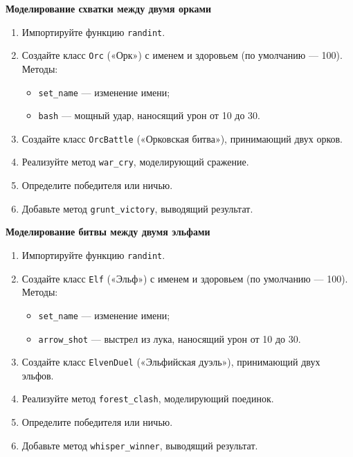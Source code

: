 \item \textbf{Моделирование схватки между двумя орками}

\begin{enumerate}
    \item Импортируйте функцию \texttt{randint}.

    \item Создайте класс \texttt{Orc} («Орк») с именем и здоровьем (по умолчанию — 100).  
    Методы:
    \begin{itemize}
        \item \texttt{set\_name} — изменение имени;
        \item \texttt{bash} — мощный удар, наносящий урон от 10 до 30.
    \end{itemize}

    \item Создайте класс \texttt{OrcBattle} («Орковская битва»), принимающий двух орков.

    \item Реализуйте метод \texttt{war\_cry}, моделирующий сражение.

    \item Определите победителя или ничью.

    \item Добавьте метод \texttt{grunt\_victory}, выводящий результат.
\end{enumerate}

\item \textbf{Моделирование битвы между двумя эльфами}

\begin{enumerate}
    \item Импортируйте функцию \texttt{randint}.

    \item Создайте класс \texttt{Elf} («Эльф») с именем и здоровьем (по умолчанию — 100).  
    Методы:
    \begin{itemize}
        \item \texttt{set\_name} — изменение имени;
        \item \texttt{arrow\_shot} — выстрел из лука, наносящий урон от 10 до 30.
    \end{itemize}

    \item Создайте класс \texttt{ElvenDuel} («Эльфийская дуэль»), принимающий двух эльфов.

    \item Реализуйте метод \texttt{forest\_clash}, моделирующий поединок.

    \item Определите победителя или ничью.

    \item Добавьте метод \texttt{whisper\_winner}, выводящий результат.
\end{enumerate}


